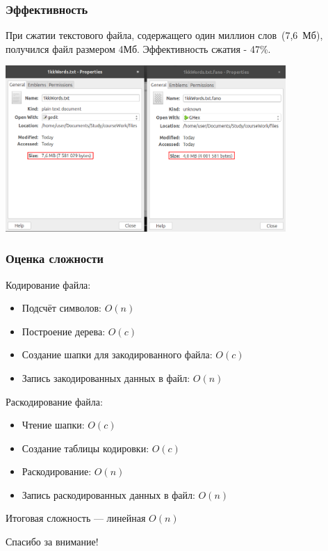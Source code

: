 \documentclass[10pt,pdf,hyperref={unicode}]{beamer}
\begin{document}
\begin{frame}
	\frametitle{Эффективность}
		При сжатии текстового файла, содержащего один миллион слов~(7,6~Мб), 
		получился файл размером 4Мб. Эффективность сжатия - 47\%.\newline

		\centering
		\includegraphics[width=0.8\textwidth]{compare.png}
\end{frame}

\begin{frame}
	\frametitle{Оценка сложности}
	Кодирование файла:\\ 
	\begin{itemize}
		\item Подсчёт символов: $O(n)$
		\item Построение дерева: $O(c)$
		\item Создание шапки для закодированного файла: $O(c)$
		\item Запись закодированных данных в файл: $O(n)$
	\end{itemize}
	Раскодирование файла:\\ 
	\begin{itemize}
		\item Чтение шапки: $O(c)$
		\item Создание таблицы кодировки: $O(c)$
		\item Раскодирование: $O(n)$
		\item Запись раскодированных данных в файл: $O(n)$
	\end{itemize}
	
	Итоговая сложность --- линейная $O(n)$
\end{frame}

\begin{frame}
	\centerline{Спасибо за внимание!}
\end{frame}
\end{document}
